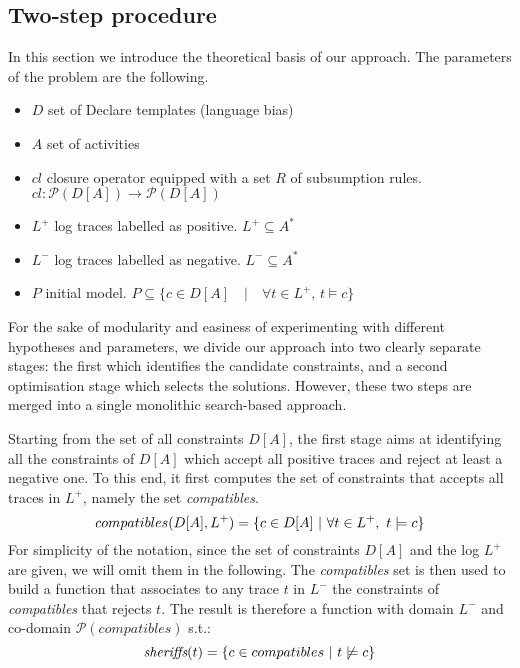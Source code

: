 \subsection{Two-step procedure}

In this section we introduce the theoretical basis of our \nd approach. The parameters of the problem are the following.
\begin{itemize}
  \item $D$ set of Declare templates (language bias)
  \item $A$ set of activities
  \item $cl$ closure operator equipped with a set $R$ of subsumption rules. $cl: \mathcal{P}(D[A])\rightarrow\mathcal{P}(D[A])$
  \item $L^+$ log traces labelled as positive. $L^+ \subseteq A^*$
  \item $L^-$ log traces labelled as negative. $L^- \subseteq A^*$
  \item $P$ initial model. $P\subseteq \{c\in D[A]\quad | \quad \forall t\in L^+,\, t\models c\}$
\end{itemize}

For the sake of modularity and easiness of experimenting with different hypotheses and parameters, we divide our approach into two clearly separate stages: the first which identifies the candidate constraints, and a second optimisation stage which selects the solutions. However, these two steps are merged into a single monolithic search-based approach. 

Starting from the set of all constraints $D[A]$, the first stage aims at identifying all the constraints of $D[A]$ which accept all positive traces and reject at least a negative one. To this end, it first computes the set of constraints that accepts all traces in $L^+$, namely the set \emph{compatibles}. 
\begin{equation}
{compatibles(D[A], L^+)} = \{c\in D[A]~|~\forall t\in L^+,~ t\models c \} \\
\end{equation}
%
For simplicity of the notation, since the set of constraints $D[A]$ and the log $L^+$ are given, we will omit them in the following.
%
The \emph{compatibles} set is then used to build a \textit{\sheriff} function that associates to any trace $t$ in $L^-$ the constraints of \textit{compatibles} that rejects $t$.
The result is therefore a function with domain $L^-$ and co-domain $\mathcal{P}({compatibles})$ s.t.:
\begin{equation}
{\textit{sheriffs}}(t) = \{c\in {compatibles}~|~t\not\models c\} \\
\end{equation}




